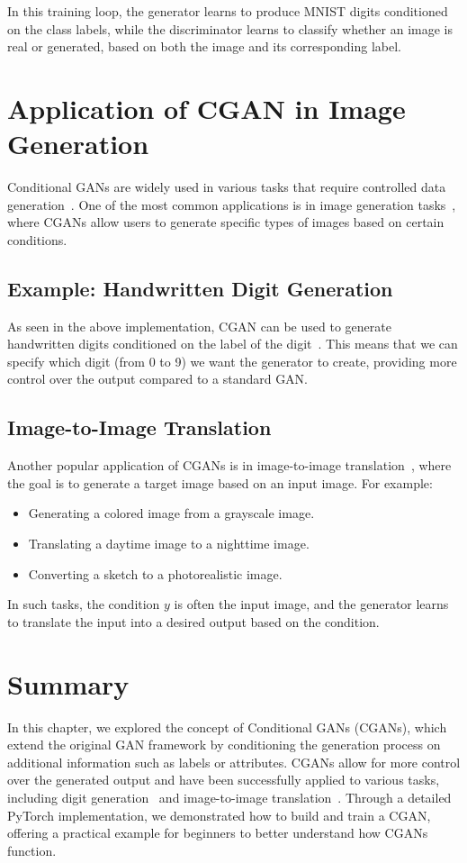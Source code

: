 In this training loop, the generator learns to produce MNIST digits conditioned on the class labels, while the discriminator learns to classify whether an image is real or generated, based on both the image and its corresponding label.

\section{Application of CGAN in Image Generation}
Conditional GANs are widely used in various tasks that require controlled data generation~\cite{mirza2014conditional, wang2018cgan, devries2019evaluation}. One of the most common applications is in image generation tasks~\cite{bao2017cvae, liu2019multi}, where CGANs allow users to generate specific types of images based on certain conditions.

\subsection{Example: Handwritten Digit Generation}
As seen in the above implementation, CGAN can be used to generate handwritten digits conditioned on the label of the digit~\cite{liu2019multi}. This means that we can specify which digit (from 0 to 9) we want the generator to create, providing more control over the output compared to a standard GAN.

\subsection{Image-to-Image Translation}
Another popular application of CGANs is in image-to-image translation~\cite{yi2017dualgan}, where the goal is to generate a target image based on an input image. For example:
\begin{itemize}
    \item Generating a colored image from a grayscale image.
    \item Translating a daytime image to a nighttime image.
    \item Converting a sketch to a photorealistic image.
\end{itemize}
In such tasks, the condition \( y \) is often the input image, and the generator learns to translate the input into a desired output based on the condition.

\section{Summary}
In this chapter, we explored the concept of Conditional GANs (CGANs), which extend the original GAN framework by conditioning the generation process on additional information such as labels or attributes. CGANs allow for more control over the generated output and have been successfully applied to various tasks, including digit generation~\cite{liu2019multi} and image-to-image translation~\cite{yi2017dualgan}. Through a detailed PyTorch implementation, we demonstrated how to build and train a CGAN, offering a practical example for beginners to better understand how CGANs function.










